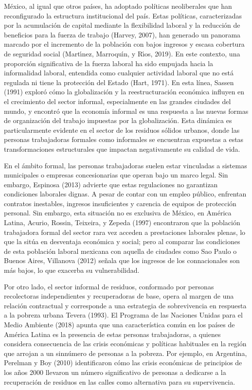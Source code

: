 \documentclass[
  spanish,
  11.5pt,
  170mm x 240mmpaper,
]{scrbook}
\begin{document}
México, al igual que otros países, ha adoptado políticas neoliberales
que han reconfigurado la estructura institucional del país. Estas
políticas, caracterizadas por la acumulación de capital mediante la
flexibilidad laboral y la reducción de beneficios para la fuerza de
trabajo (Harvey, 2007), han generado un panorama marcado por el
incremento de la población con bajos ingresos y escasa cobertura de
seguridad social (Martı́nez, Marroquı́n, y Rı́os, 2019). En este contexto,
una proporción significativa de la fuerza laboral ha sido empujada hacia
la informalidad laboral, entendida como cualquier actividad laboral que
no está regulada ni tiene la protección del Estado (Hart, 1971). En esta
línea, Sassen (1991) exploró cómo la globalización y la reestructuración
económica influyen en el crecimiento del sector informal, especialmente
en las grandes ciudades del mundo, y encontró que la economía informal
es una respuesta a las nuevas formas de organización del trabajo
impuestas por la globalización. Esta dinámica es particularmente
evidente en el sector de los residuos sólidos urbanos, donde las
personas trabajadoras formales como informales se encuentran expuestas a
estas transformaciones estructurales que impactan negativamente su
calidad de vida.

En el ámbito formal, las personas trabajadoras suelen estar vinculadas a
sistemas municipales o empresas concesionarias que operan bajo un marco
legal. Sin embargo, Espinosa (2013) advierte que estas regulaciones no
garantizan condiciones laborales dignas. A pesar de contar con un empleo
público, enfrentan contratos inestables, ingresos insuficientes y
carencia de equipos de protección personal. Sin embargo, esta situación
no es exclusiva de México, en América Latina, Acurio, Rossin, Teixeira,
y Zepeda (1997) encontraron que la población trabajadora formal del
sector rara vez acceden a prestaciones laborales plenas, lo que la sitúa
en desventaja económica y social; pero al comparar las condiciones de
esta población laboral mexicana con aquella de ciudades como Sao Paulo o
Buenos Aires, Villanova (2012) señala que los ingresos de los
connacionales son más bajos, lo que exacerba su vulnerabilidad.

Por otro lado, el sector informal de residuos, conformado por personas
recolectoras independientes y recuperadoras de base, opera al margen de
una relación contractual y corresponde a una estrategia de sobrevivencia
en respuesta a la pobreza urbana Tevera (1993). El Programa de las
Naciones Unidas para el Medio Ambiente (2018) apunta que una
característica común en los países de América Latina es la presencia de
estas personas trabajadoras, a quienes considera consecuencia de las
crisis económicas y políticas habituales en la región que arrojan a un
sinnúmero de personas a la pobreza. Por ejemplo, en Argentina, Perelman
y Boy (2010) identificaron cómo las crisis económicas de principios de
los años 2000 llevaron un número significativo de personas a dedicarse a
la recuperación de residuos en las calles como alternativa para su
supervivencia.
\end{document}
